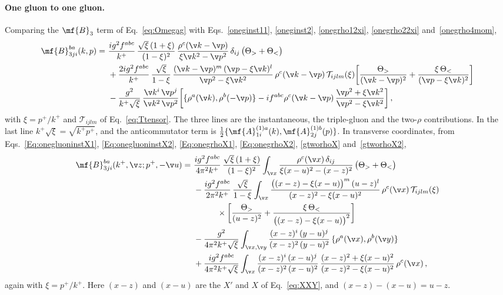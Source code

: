 \paragraph{One gluon to one gluon.}
Comparing the $\mf{B}_{3}$ term of Eq.~\eqref{eq:Omegag} with Eqs.~\eqref{oneginst11}, \eqref{oneginst2},
\eqref{onegrho12xi}, \eqref{onegrho22xi} and~\eqref{onegrho4mom},
\begin{align}\label{B3coeffM}
\mf{B}^{ba}_{3ji}(k,p)=\ &\frac{ig^{2}f^{abc}}{k^{+}}\,\frac{\sqrt{\xi}\,(1+\xi)}{(1-\xi)^{2}}\,
\frac{\rho^{c}(\v k-\v p)}{\xi\v k^{2}-\v p^{2}}\,\delta_{ij}\,\big(\Theta_{>}+\Theta_{<}\big)\notag\\
&+\frac{2ig^{2}f^{abc}}{k^{+}}\,\frac{\sqrt{\xi}}{1-\xi}\,
\frac{(\v k-\v p)^{m}\,(\v p-\xi\v k)^{l}}{\v p^{2}-\xi\v k^{2}}\,\rho^{c}(\v k-\v p)\,\mathcal{T}_{ijlm}(\xi)
\bigg[\frac{\Theta_{>}}{(\v k-\v p)^{2}}+\frac{\xi\,\Theta_{<}}{(\v p-\xi\v k)^{2}}\bigg]\notag\\
&-\frac{g^{2}}{k^{+}\sqrt{\xi}}\,\frac{\v k^{i}\,\v p^{j}}{\v k^{2}\,\v p^{2}}
\bigg[\{\rho^{a}(\v k),\rho^{b}(-\v p)\}-if^{abc}\rho^{c}(\v k-\v p)\,\frac{\v p^{2}+\xi\v k^{2}}{\v p^{2}-\xi\v k^{2}}\bigg]\,,
\end{align}
with $\xi=p^{+}/k^{+}$ and $\mathcal{T}_{ijlm}$ of Eq.~\eqref{eq:Ttensor}. The three lines are the
instantaneous, the triple-gluon and the two-$\rho$ contributions. In the last line
$k^{+}\sqrt{\xi}=\sqrt{k^{+}p^{+}}$, and the anticommutator term is
$\frac{1}{2}\{\mf{A}^{(1)a}_{1i}(k),\mf{A}^{(1)b}_{2j}(p)\}$. In transverse coordinates, from
Eqs.~\eqref{Eq:onegluoninstX1}, \eqref{Eq:onegluoninstX2}, \eqref{Eq:onegrhoX1}, \eqref{Eq:onegrhoX2},
\eqref{gtworhoX} and~\eqref{gtworhoX2},
\begin{align}\label{B3coeffX}
\mf{B}^{ba}_{3ji}(k^{+},\v z;p^{+},-\v u)=\ &\frac{ig^{2}f^{abc}}{4\pi^{2}k^{+}}\,\frac{\sqrt{\xi}\,(1+\xi)}{(1-\xi)^{2}}
\int_{\v x}\frac{\rho^{c}(\v x)\,\delta_{ij}}{\xi(x-u)^{2}-(x-z)^{2}}\,\big(\Theta_{>}+\Theta_{<}\big)\notag\\
&-\frac{ig^{2}f^{abc}}{2\pi^{2}k^{+}}\,\frac{\sqrt{\xi}}{1-\xi}\int_{\v x}
\frac{\big((x-z)-\xi(x-u)\big)^{m}\,(u-z)^{l}}{(x-z)^{2}-\xi(x-u)^{2}}\,\rho^{c}(\v x)\,\mathcal{T}_{ijlm}(\xi)\notag\\
&\hspace{1cm}\times\bigg[\frac{\Theta_{>}}{(u-z)^{2}}+\frac{\xi\,\Theta_{<}}{\big((x-z)-\xi(x-u)\big)^{2}}\bigg]\notag\\
&-\frac{g^{2}}{4\pi^{2}k^{+}\sqrt{\xi}}\int_{\v x,\v y}\frac{(x-z)^{i}\,(y-u)^{j}}{(x-z)^{2}\,(y-u)^{2}}\,
\{\rho^{a}(\v x),\rho^{b}(\v y)\}\notag\\
&+\frac{ig^{2}f^{abc}}{4\pi^{2}k^{+}\sqrt{\xi}}\int_{\v x}\frac{(x-z)^{i}\,(x-u)^{j}}{(x-z)^{2}\,(x-u)^{2}}\,
\frac{(x-z)^{2}+\xi(x-u)^{2}}{(x-z)^{2}-\xi(x-u)^{2}}\,\rho^{c}(\v x)\,,
\end{align}
again with $\xi=p^{+}/k^{+}$. Here $(x-z)$ and $(x-u)$ are the $X'$ and $X$ of Eq.~\eqref{eq:XXY}, and
$(x-z)-(x-u)=u-z$.

